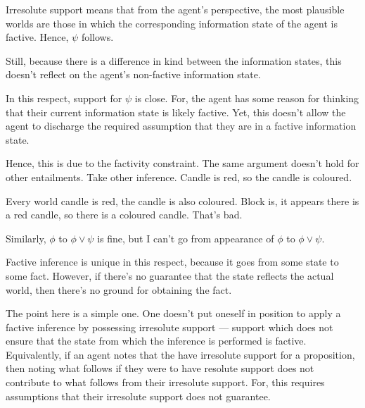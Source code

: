 \documentclass[10pt]{article}
\newcommand{\hozline}[0]{%
  \noindent\hdashrule[0.5ex][c]{\textwidth}{.1pt}{}
}
\begin{document}
\begin{note}
  Irresolute support means that from the agent's perspective, the most plausible worlds are those in which the corresponding information state of the agent is factive.
  Hence, \(\psi\) follows.

  Still, because there is a difference in kind between the information states, this doesn't reflect on the agent's non-factive information state.

  In this respect, support for \(\psi\) is close.
  For, the agent has some reason for thinking that their current information state is likely factive.
  Yet, this doesn't allow the agent to discharge the required assumption that they are in a factive information state.

\hozline

  Hence, this is due to the factivity constraint.
  The same argument doesn't hold for other entailments.
  Take other inference.
  Candle is red, so the candle is coloured.

  Every world candle is red, the candle is also coloured.
  Block is, it appears there is a red candle, so there is a coloured candle.
  That's bad.

  Similarly, \(\phi\) to \(\phi \lor \psi\) is fine, but I can't go from appearance of \(\phi\) to \(\phi \lor \psi\).

  Factive inference is unique in this respect, because it goes from some state to some fact.
  However, if there's no guarantee that the state reflects the actual world, then there's no ground for obtaining the fact.
\end{note}

\begin{note}[Summarising]
  The point here is a simple one.
  One doesn't put oneself in position to apply a factive inference by possessing irresolute support --- support which does not ensure that the state from which the inference is performed is factive.
  Equivalently, if an agent notes that the have irresolute support for a proposition, then noting what follows if they were to have resolute support does not contribute to what follows from their irresolute support.
  For, this requires assumptions that their irresolute support does not guarantee.
\end{note}
\end{document}
